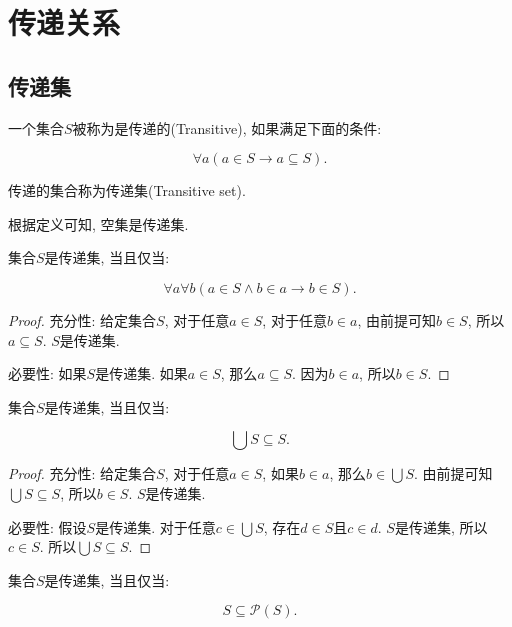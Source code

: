 \chapter{传递关系}
\section{传递集}
\begin{definition}
	一个集合$S$被称为是传递的(Transitive), 如果满足下面的条件:
	
	\begin{equation}
		\forall a(a\in S\rightarrow a\subseteq S).
	\end{equation}
	
	传递的集合称为传递集(Transitive set).
\end{definition}

根据定义可知, 空集是传递集.

\begin{proposition}
	集合$S$是传递集, 当且仅当:
	
	\begin{equation}
		\forall a\forall b(a\in S\wedge b\in a\rightarrow b\in S).
	\end{equation}
\end{proposition}

\begin{proof}
	充分性: 给定集合$S$, 对于任意$a\in S$, 对于任意$b\in a$, 由前提可知$b\in S$, 所以$a\subseteq S$. $S$是传递集.
	
	必要性: 如果$S$是传递集. 如果$a\in S$, 那么$a\subseteq S$. 因为$b\in a$, 所以$b\in S$.
\end{proof}

\begin{proposition}
	集合$S$是传递集, 当且仅当:
	
	\begin{equation}
		\bigcup S\subseteq S.
	\end{equation}
\end{proposition}

\begin{proof}
	充分性: 给定集合$S$, 对于任意$a\in S$, 如果$b\in a$, 那么$b\in \bigcup S$. 由前提可知$\bigcup S\subseteq S$, 所以$b\in S$. $S$是传递集.
	
	必要性: 假设$S$是传递集. 对于任意$c\in \bigcup S$, 存在$d\in S$且$c\in d$. $S$是传递集, 所以$c\in S$. 所以$\bigcup S\subseteq S$.
\end{proof}

\begin{proposition}
	集合$S$是传递集, 当且仅当:
	
	\begin{equation}
		S\subseteq \mathscr P(S).
	\end{equation}
\end{proposition}

